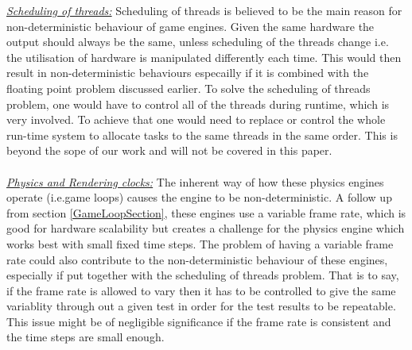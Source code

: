 %
%
\noindent\underline{\textit{Scheduling of threads:}} Scheduling of threads is believed to be the main reason for non-deterministic behaviour of game engines. Given the same hardware the output should always be the same, unless scheduling of the threads change i.e. the utilisation of hardware is manipulated differently each time. This would then result in non-deterministic behaviours especailly if it is combined with the floating point problem discussed earlier. 
To solve the scheduling of threads problem, one would have to control all of the threads during runtime, which is very involved. To achieve that one would need to replace or control the whole run-time system to allocate tasks to the same threads in the same order. This is beyond the sope of our work and will not be covered in this paper.\\\\
%
\noindent\underline{\textit{Physics and Rendering clocks:}}
The inherent way of how these physics engines operate (i.e.game loops) causes the engine to be non-deterministic. 
A follow up from section \ref{GameLoopSection}, these engines use a variable frame rate, which is good for hardware scalability but creates a challenge for the physics engine which works best with small fixed time steps. 
The problem of having a variable frame rate could also contribute to the non-deterministic behaviour of these engines, especially if put together with the scheduling of threads problem. That is to say, if the frame rate is allowed to vary then it has to be controlled to give the same variablity through out a given test in order for the test results to be repeatable. This issue might be of negligible significance if the frame rate is consistent and the time steps are small enough. \\\\
